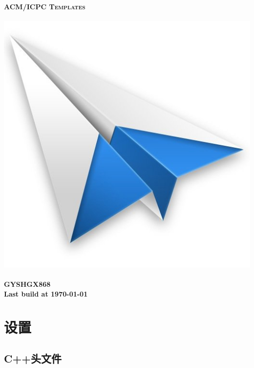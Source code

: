 \documentclass[a4paper, 12pt]{article}
\begin{document}
\pagestyle{fancy}
\fancyfoot[C]{}
\cfoot{\thepage}
\begin{titlepage}
	\pagestyle{empty}
	
  \begin{center}
		~\\[80pt]
    \fontsize{40pt}{\baselineskip}\selectfont \textsc{\textbf{ACM/ICPC Templates}}\\[32pt]
    ~\\[20pt]
    \includegraphics[scale=.7]{./Cover.jpg}
    ~\\[20pt]
    \Huge\textbf{GYSHGX868}\\[14pt]
    \Large\textbf{Last build at \today}
  \end{center}
\end{titlepage}
\restoregeometry

\setcounter{page}{1}
\tableofcontents
\clearpage
\setcounter{page}{1}

\section{设置}

\subsection{C++头文件}

\end{document}
